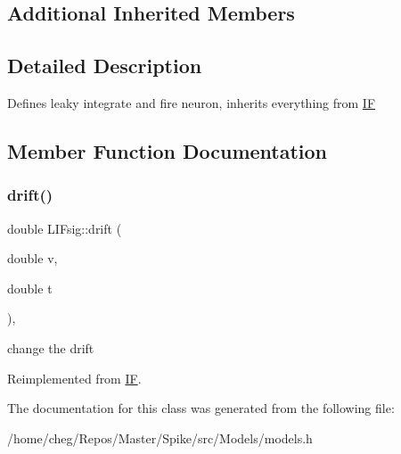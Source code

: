 \subsection*{Additional Inherited Members}


\subsection{Detailed Description}
Defines leaky integrate and fire neuron, inherits everything from \hyperlink{classIF}{IF} 

\subsection{Member Function Documentation}
\mbox{\label{classLIFsig_a169dcb5d3704157102bbc725445cf0a5}} 
\subsubsection{\texorpdfstring{drift()}{drift()}}
{\footnotesize\ttfamily double L\+I\+Fsig\+::drift (\begin{DoxyParamCaption}\item[{double}]{v,  }\item[{double}]{t }\end{DoxyParamCaption})\hspace{0.3cm}{\ttfamily [inline]}, {\ttfamily [virtual]}}

change the drift 

Reimplemented from \hyperlink{classIF_a9bbd53df68cb9028bf87cf5273253e91}{IF}.



The documentation for this class was generated from the following file\+:\begin{DoxyCompactItemize}
\item 
/home/cheg/\+Repos/\+Master/\+Spike/src/\+Models/models.\+h\end{DoxyCompactItemize}
